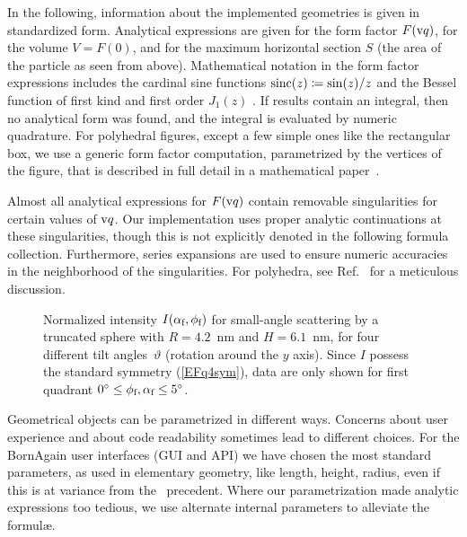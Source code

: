 In the following,
information about the implemented geometries is given in standardized form.
Analytical expressions are given for the form factor $F(\q)$,
for the volume $V=F(0)$,
and for the maximum horizontal section $S$
(the area of the particle as seen from above).
Mathematical notation in the form factor expressions includes
the cardinal sine functions $\sinc(z)\coloneqq\sin(z)/z$
and the Bessel function of first kind and first order $J_1(z)$
\cite[Ch.~9]{AbSt64}.
If results contain an integral,
then no analytical form was found,
and the integral is evaluated by numeric quadrature.
%
For polyhedral figures,
except a few simple ones like the rectangular box,
we use a generic form factor computation,
parametrized by the vertices of the figure,
that is described in full detail in a mathematical paper~\cite{Wut17}.

Almost all analytical expressions for $F(\q)$ contain
removable singularities for certain values of $\q$.
Our implementation uses proper analytic continuations at these singularities,
though this is not explicitly denoted in the following formula collection.
Furthermore, series expansions are used to ensure numeric accuracies
in the neighborhood of the singularities.
For polyhedra, see Ref.~\cite{Wut17} for a meticulous discussion.

\begin{figure}[t]
\begin{center}
\end{center}
\caption{Normalized intensity $I(\alpha_\sf,\phi_\sf)$
for small-angle scattering by a truncated sphere with $R=4.2$~nm and $H=6.1$~nm,
for four different tilt angles~$\vartheta$ (rotation around the $y$ axis).
Since $I$ possess the standard symmetry (\protect\ref{EFq4sym}),
data are only shown for first quadrant $0^\circ\le\phi_\sf,\alpha_\sf\le 5^\circ$.}
\label{F1quadrants}
\end{figure}

Geometrical objects can be parametrized in different ways.
Concerns about user experience and about code readability
sometimes lead to different choices.
For the BornAgain user interfaces (GUI and API)
we have chosen the most standard parameters,
as used in elementary geometry, like length, height, radius,
even if this is at variance from the \IsGISAXS\ precedent.
Where our parametrization made analytic expressions too tedious,
we use alternate internal parameters to alleviate the formul\ae.

